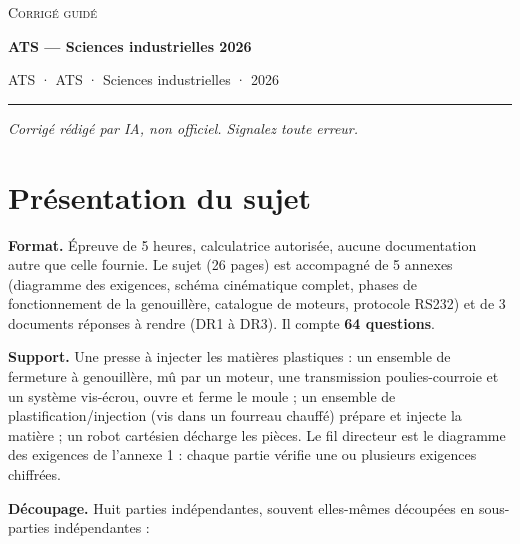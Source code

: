 \documentclass[11pt,a4paper]{article}
\begin{document}
\thispagestyle{plain}
\begin{center}
  {\small\scshape Corrigé guidé}\par\smallskip
  {\LARGE\bfseries ATS — Sciences industrielles 2026\par}\medskip
  {\large ATS · ATS · Sciences industrielles · 2026\par}
\end{center}
\vspace{2pt}\hrule\vspace{8pt}

\emph{Corrigé rédigé par IA, non officiel. Signalez toute erreur.}

\hypertarget{pruxe9sentation-du-sujet}{%
\section{Présentation du sujet}\label{pruxe9sentation-du-sujet}}

\textbf{Format.} Épreuve de 5 heures, calculatrice autorisée, aucune documentation autre que celle fournie. Le sujet (26 pages) est accompagné de 5 annexes (diagramme des exigences, schéma cinématique complet, phases de fonctionnement de la genouillère, catalogue de moteurs, protocole RS232) et de 3 documents réponses à rendre (DR1 à DR3). Il compte \textbf{64 questions}.

\textbf{Support.} Une presse à injecter les matières plastiques : un ensemble de fermeture à genouillère, mû par un moteur, une transmission poulies-courroie et un système vis-écrou, ouvre et ferme le moule ; un ensemble de plastification/injection (vis dans un fourreau chauffé) prépare et injecte la matière ; un robot cartésien décharge les pièces. Le fil directeur est le diagramme des exigences de l'annexe 1 : chaque partie vérifie une ou plusieurs exigences chiffrées.

\textbf{Découpage.} Huit parties indépendantes, souvent elles-mêmes découpées en sous-parties indépendantes :
\end{document}
